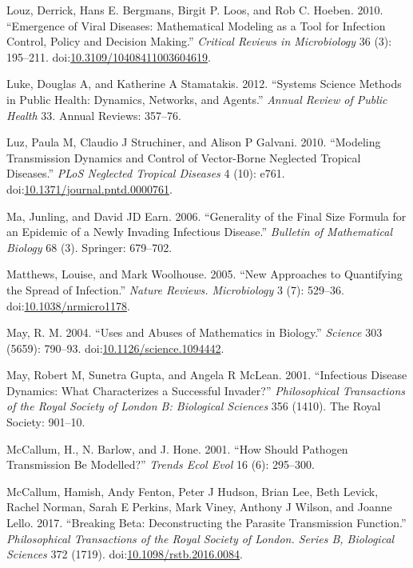 \documentclass[]{book}
\theoremstyle{definition}
\theoremstyle{definition}
\theoremstyle{definition}
\theoremstyle{remark}
\begin{document}
\hypertarget{ref-louz10}{}
Louz, Derrick, Hans E. Bergmans, Birgit P. Loos, and Rob C. Hoeben.
2010. ``Emergence of Viral Diseases: Mathematical Modeling as a Tool for
Infection Control, Policy and Decision Making.'' \emph{Critical Reviews
in Microbiology} 36 (3): 195--211.
doi:\href{https://doi.org/10.3109/10408411003604619}{10.3109/10408411003604619}.

\hypertarget{ref-luke12}{}
Luke, Douglas A, and Katherine A Stamatakis. 2012. ``Systems Science
Methods in Public Health: Dynamics, Networks, and Agents.'' \emph{Annual
Review of Public Health} 33. Annual Reviews: 357--76.

\hypertarget{ref-luz10}{}
Luz, Paula M, Claudio J Struchiner, and Alison P Galvani. 2010.
``Modeling Transmission Dynamics and Control of Vector-Borne Neglected
Tropical Diseases.'' \emph{PLoS Neglected Tropical Diseases} 4 (10):
e761.
doi:\href{https://doi.org/10.1371/journal.pntd.0000761}{10.1371/journal.pntd.0000761}.

\hypertarget{ref-ma06}{}
Ma, Junling, and David JD Earn. 2006. ``Generality of the Final Size
Formula for an Epidemic of a Newly Invading Infectious Disease.''
\emph{Bulletin of Mathematical Biology} 68 (3). Springer: 679--702.

\hypertarget{ref-matthews05}{}
Matthews, Louise, and Mark Woolhouse. 2005. ``New Approaches to
Quantifying the Spread of Infection.'' \emph{Nature Reviews.
Microbiology} 3 (7): 529--36.
doi:\href{https://doi.org/10.1038/nrmicro1178}{10.1038/nrmicro1178}.

\hypertarget{ref-may04}{}
May, R. M. 2004. ``Uses and Abuses of Mathematics in Biology.''
\emph{Science} 303 (5659): 790--93.
doi:\href{https://doi.org/10.1126/science.1094442}{10.1126/science.1094442}.

\hypertarget{ref-may01}{}
May, Robert M, Sunetra Gupta, and Angela R McLean. 2001. ``Infectious
Disease Dynamics: What Characterizes a Successful Invader?''
\emph{Philosophical Transactions of the Royal Society of London B:
Biological Sciences} 356 (1410). The Royal Society: 901--10.

\hypertarget{ref-mccallum01}{}
McCallum, H., N. Barlow, and J. Hone. 2001. ``How Should Pathogen
Transmission Be Modelled?'' \emph{Trends Ecol Evol} 16 (6): 295--300.

\hypertarget{ref-mccallum17}{}
McCallum, Hamish, Andy Fenton, Peter J Hudson, Brian Lee, Beth Levick,
Rachel Norman, Sarah E Perkins, Mark Viney, Anthony J Wilson, and Joanne
Lello. 2017. ``Breaking Beta: Deconstructing the Parasite Transmission
Function.'' \emph{Philosophical Transactions of the Royal Society of
London. Series B, Biological Sciences} 372 (1719).
doi:\href{https://doi.org/10.1098/rstb.2016.0084}{10.1098/rstb.2016.0084}.
\end{document}

